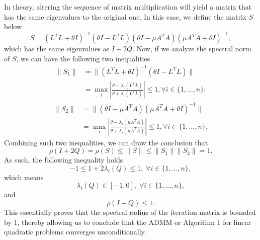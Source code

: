 \documentclass[letterpaper]{article} %
\begin{document}
In theory, altering the sequence of matrix multiplication will yield a matrix that has the same eigenvalues to the original one. In this case, we define the matrix $S$ below
\begin{equation*}
    S =  (L^T L + \theta I)^{-1}( \theta I-L^T L)
   ( \theta I-\mu A^T A)(\mu A^T A + \theta I)^{-1},
\end{equation*}
which has the same eigenvalues as $I+2Q$. Now, if we analyze the spectral norm of $S$, we can have the following two inequalities
\begin{equation*}
\begin{split}
    \|S_1\| & =\| (L^T L + \theta I)^{-1}( \theta I-L^T L)\| \\
            & =\max_i\left|\frac{\theta-\lambda_i (L^T L)}{\theta+\lambda_i (L^T L)}\right| \leq 1, \forall i \in \{1,...,n\}.
\end{split}
\end{equation*}
\begin{equation*}
\begin{split}
		\|S_2\| & = \| ( \theta I-\mu A^T A)(\mu A^T A + \theta I)^{-1} \| \\
                    & = \max_i\left|\frac{\theta-\lambda_i (\mu A^T A)}{\theta+\lambda_i (\mu A^T A)}\right|\leq 1, \forall i \in \{1,...,n\}.
  \end{split}
\end{equation*}
Combining such two inequalities, we can draw the conclusion that
\begin{equation*}
		\rho(I + 2Q)=\rho(S)\leq \|S\|\leq\|S_1\| \|S_2\|=1.
\end{equation*}
As such, the following inequality holds
\begin{equation*}
		-1\leq 1+2\lambda_i(Q)\leq 1, \;\forall i \in \{1,...,n\},
\end{equation*}
which means 
\begin{equation*}
		\lambda_i (Q)\in [-1,0], \; \forall i \in \{1,...,n\},
\end{equation*}
and 
\begin{equation*}
    \rho(I+Q)\leq 1.
\end{equation*}
This essentially proves that the spectral radius of the iteration matrix is bounded by 1, thereby allowing us to conclude that the ADMM or Algorithm 1 for linear quadratic problems converges unconditionally.
\end{document}
